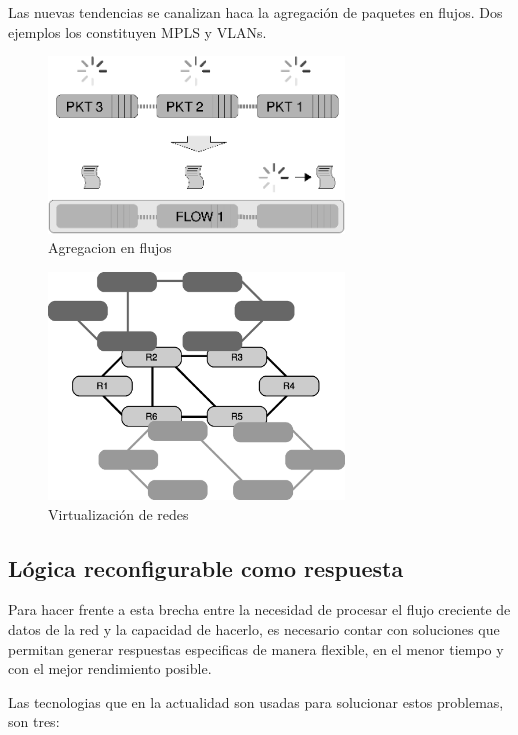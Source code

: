 Las nuevas tendencias se canalizan haca la agregación de paquetes en flujos. Dos ejemplos los constituyen MPLS y VLANs.


\begin{figure}[h]
  \centering
	\includegraphics[width=0.70\textwidth]{1-introduccion/graf/packet_vs_flow-crop.eps}
  \caption{Agregacion en flujos}
  \label{fig:flow}
\end{figure}

\begin{figure}[h]
  \centering
	\includegraphics[width=0.70\textwidth]{1-introduccion/graf/network_virtualization_2.eps}
  \caption{Virtualización de redes}
  \label{fig:virt}
\end{figure}


\subsection{Lógica reconfigurable como respuesta}

Para hacer frente a esta brecha entre la necesidad de procesar el flujo creciente de datos de la red y la capacidad de hacerlo, es necesario contar con soluciones que permitan generar respuestas especificas de manera flexible, en el menor tiempo y con el mejor rendimiento posible.

Las tecnologias que en la actualidad son usadas para solucionar estos problemas, son tres:

